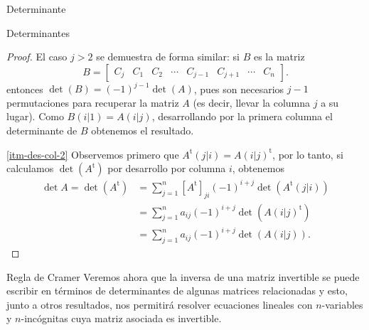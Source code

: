 \documentclass[a4paper,12pt,twoside,spanish,reqno]{amsbook}
\numberwithin{equation}{section}
\theoremstyle{definition}
\theoremstyle{remark}
\renewcommand{\t}{{\operatorname{t}}}
\begin{document}
\begin{chapter}{Determinante}
\begin{section}{Determinantes}
\begin{proof}
             El caso $j>2$  se demuestra de forma similar: si $B$ es la matriz
             $$
             B = \begin{bmatrix} C_j &C_1 &C_2 &\cdots& C_{j-1}&C_{j+1}&\cdots &C_n\end{bmatrix}.
             $$        
             entonces $\det(B)=(-1)^{j-1}\det(A)$, pues son necesarios $j-1$ permutaciones para recuperar la matriz $A$ (es decir, llevar la columna $j$ a su lugar).
             Como $B(i|1) = A(i|j)$,  desarrollando por la primera columna el determinante de $B$ obtenemos el resultado.  
             
             
             \ref{itm-des-col-2} Observemos primero que $A^\t(j|i) = A(i|j)^\t$, por lo tanto, si calculamos $\det(A^\t)$ por desarrollo por columna $i$, obtenemos 
             \begin{align*}
             \det A = \det(A^\t)&=\sum_{j=1}^{n} [A^\t]_{ji} (-1)^{i+j}\det (A^\t(j|i)) \\
             &=  \sum_{j=1}^{n} a_{ij} (-1)^{i+j}\det (A(i|j)^\t) \\
             &= \sum_{j=1}^{n} a_{ij} (-1)^{i+j}\det (A(i|j)).
             \end{align*}
             
             
         \end{proof}
         
         
        \end{section}
    
         
         
         \begin{section}{Regla de Cramer}\label{seccion-regla-de-cramer} Veremos ahora que la inversa de una matriz invertible se puede escribir en términos de determinantes de algunas matrices relacionadas y esto, junto a otros resultados, nos permitirá resolver ecuaciones lineales con $n$-variables y $n$-incógnitas cuya matriz asociada es invertible.  
             

\end{section}
\end{chapter}
\end{document}
